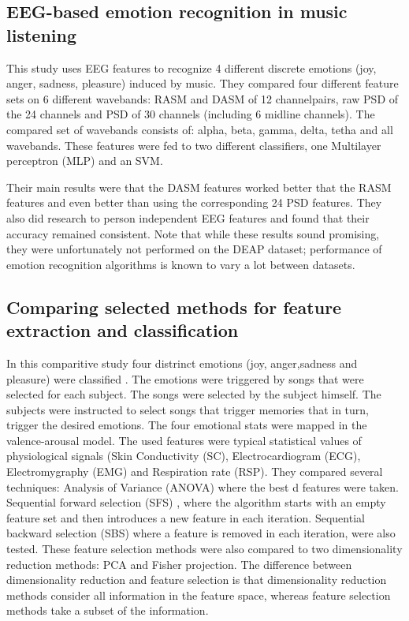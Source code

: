 \subsection{EEG-based emotion recognition in music listening}

This study\citep{emorecoghard} uses EEG features to recognize 4 different discrete emotions (joy, anger, sadness, pleasure) induced by music. They compared four different feature sets on 6 different wavebands: RASM and DASM of 12 channelpairs, raw PSD of the 24 channels and PSD of 30 channels (including 6 midline channels). The compared set of wavebands consists of: alpha, beta, gamma, delta, tetha and all wavebands. These features were fed to two different classifiers, one Multilayer perceptron (MLP)  and an SVM. 

\npar

Their main results were that the DASM features worked better that the RASM features and even better than using the corresponding 24 PSD features. They also did research to person independent EEG features and found that their accuracy remained consistent. Note that while these results sound promising, they were unfortunately not performed on the DEAP dataset; performance of emotion recognition algorithms is known to vary a lot between datasets\citep{PhytoEm}.

\subsection{Comparing selected methods for feature extraction and classification}

In this comparitive study four distrinct emotions (joy, anger,sadness and pleasure) were classified \citep{PhytoEm}. The emotions were triggered by songs that were selected for each subject. The songs were selected by the subject himself. The subjects were instructed to select songs that trigger memories that in turn, trigger the desired emotions. The four emotional stats were mapped in the valence-arousal model. The used features were typical statistical values of physiological signals (Skin Conductivity (SC), Electrocardiogram (ECG), Electromygraphy (EMG) and Respiration rate (RSP). They compared several techniques: Analysis of Variance (ANOVA)  where the best d features were taken. Sequential forward selection (SFS) , where the algorithm starts with an empty feature set and then introduces a new feature in each iteration. Sequential backward selection (SBS)  where a feature is removed in each iteration, were also tested. These feature selection methods were also compared to two dimensionality reduction methods: PCA and Fisher projection. The difference between dimensionality reduction and feature selection is that dimensionality reduction methods consider all information in the feature space, whereas feature selection methods take a subset of the information.

